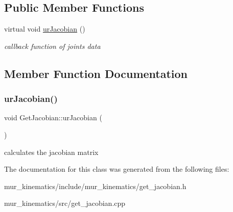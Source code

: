 \subsection*{Public Member Functions}
\begin{DoxyCompactItemize}
\item 
virtual void \hyperlink{classcalculate__jacobian_1_1GetJacobian_abe5c223f433aa0d50c40c43fefe95542}{ur\+Jacobian} ()
\begin{DoxyCompactList}\small\item\em callback function of joints data \end{DoxyCompactList}\end{DoxyCompactItemize}


\subsection{Member Function Documentation}
\mbox{\label{classcalculate__jacobian_1_1GetJacobian_abe5c223f433aa0d50c40c43fefe95542}} 
\subsubsection{\texorpdfstring{ur\+Jacobian()}{urJacobian()}}
{\footnotesize\ttfamily void Get\+Jacobian\+::ur\+Jacobian (\begin{DoxyParamCaption}{ }\end{DoxyParamCaption})\hspace{0.3cm}{\ttfamily [virtual]}}

calculates the jacobian matrix 

The documentation for this class was generated from the following files\+:\begin{DoxyCompactItemize}
\item 
mur\+\_\+kinematics/include/mur\+\_\+kinematics/get\+\_\+jacobian.\+h\item 
mur\+\_\+kinematics/src/get\+\_\+jacobian.\+cpp\end{DoxyCompactItemize}

